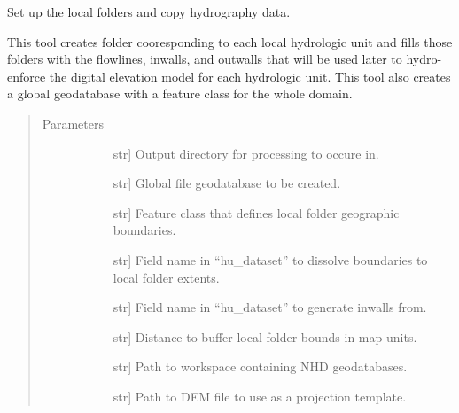 \documentclass[letterpaper,10pt,english]{sphinxmanual}
\begin{document}
\begin{fulllineitems}
\label{\detokenize{databaseSetup:databaseSetup.databaseSetup}}
Set up the local folders and copy hydrography data.

This tool creates folder cooresponding to each local hydrologic unit and fills those folders with the flowlines, inwalls, and outwalls that will be used later to hydro-enforce the digital elevation model for each hydrologic unit. This tool also creates a global geodatabase with a feature class for the whole domain.
\begin{quote}\begin{description}
\item[{Parameters}] \leavevmode\begin{description}
\item[{}] \leavevmode{[}str{]}
Output directory for processing to occure in.

\item[{}] \leavevmode{[}str{]}
Global file geodatabase to be created.

\item[{}] \leavevmode{[}str{]}
Feature class that defines local folder geographic boundaries.

\item[{}] \leavevmode{[}str{]}
Field name in “hu\_dataset” to dissolve boundaries to local folder extents.

\item[{}] \leavevmode{[}str{]}
Field name in “hu\_dataset” to generate inwalls from.

\item[{}] \leavevmode{[}str{]}
Distance to buffer local folder bounds in map units.

\item[{}] \leavevmode{[}str{]}
Path to workspace containing NHD geodatabases.

\item[{}] \leavevmode{[}str{]}
Path to DEM file to use as a projection template.


\end{description}
\end{description}
\end{quote}
\end{fulllineitems}
\end{document}
